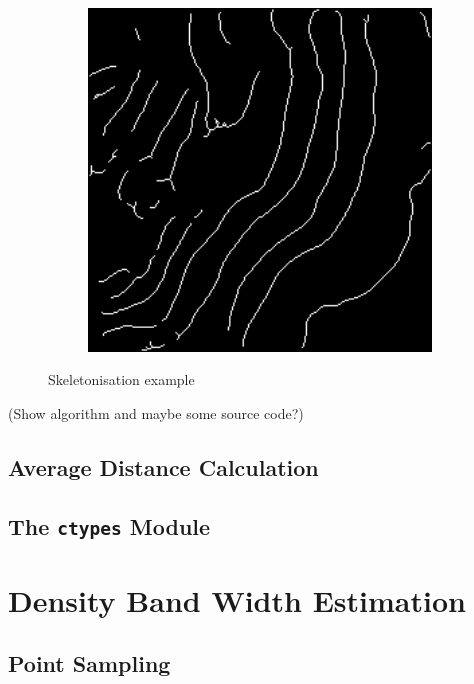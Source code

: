 \begin{figure}[t]
\begin{subfigure}[t]{0.32\textwidth}
    \end{subfigure}
    ~
    \begin{subfigure}[t]{0.32\textwidth}
        \centering
        \includegraphics[width=1\textwidth, valign=c]{images/skel-skel.png}
    \end{subfigure}
    \caption{Skeletonisation example}
    \label{fig:skeletonisation}
\end{figure}

(Show algorithm and maybe some source code?)

\subsection{Average Distance Calculation}

\subsection{The \texttt{ctypes} Module}

\newpage

\section{Density Band Width Estimation}

\subsection{Point Sampling}
